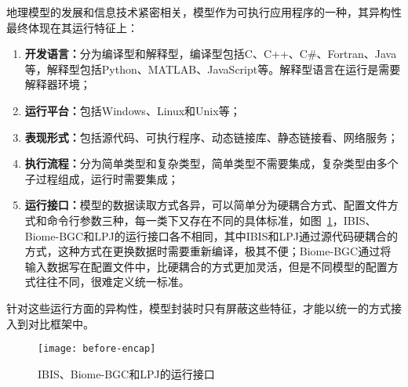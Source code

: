 地理模型的发展和信息技术紧密相关，模型作为可执行应用程序的一种，其异构性最终体现在其运行特征上：
\begin{enumerate}[(1)]
    \item \textbf{开发语言：}分为编译型和解释型，编译型包括C、C++、C\#、Fortran、Java等，解释型包括Python、MATLAB、JavaScript等。解释型语言在运行是需要解释器环境；
    \item \textbf{运行平台：}包括Windows、Linux和Unix等；
    \item \textbf{表现形式：}包括源代码、可执行程序、动态链接库、静态链接看、网络服务；
    \item \textbf{执行流程：}分为简单类型和复杂类型，简单类型不需要集成，复杂类型由多个子过程组成，运行时需要集成；
    \item \textbf{运行接口：}模型的数据读取方式各异，可以简单分为硬耦合方式、配置文件方式和命令行参数三种，每一类下又存在不同的具体标准，如图~\ref{fig:before-encap}，IBIS、Biome-BGC和LPJ的运行接口各不相同，其中IBIS和LPJ通过源代码硬耦合的方式，这种方式在更换数据时需要重新编译，极其不便；Biome-BGC通过将输入数据写在配置文件中，比硬耦合的方式更加灵活，但是不同模型的配置方式往往不同，很难定义统一标准。
\end{enumerate}

针对这些运行方面的异构性，模型封装时只有屏蔽这些特征，才能以统一的方式接入到对比框架中。

\begin{figure}[!htbp]
    \centering
    \texttt{[image: before-encap]}
    \caption{IBIS、Biome-BGC和LPJ的运行接口}
    \label{fig:before-encap}
\end{figure}

